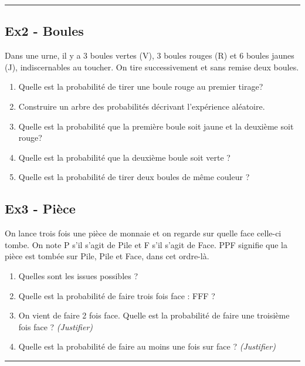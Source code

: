 \documentclass[11pt]{article}
\newcommand{\horrule}[1]{\rule{\linewidth}{#1}} %
\begin{document}
\horrule{1px}

\begin{multicols}{2}
  \subsection*{Ex2 - Boules}
  Dans une urne, il y a 3 boules vertes (V), 3 boules rouges (R) et 6 boules jaunes (J), indiscernables au toucher. On tire successivement et sans remise
  deux boules.
  \begin{enumerate}
  \item Quelle est la probabilité de tirer une boule rouge au premier tirage?
  \item Construire un arbre des probabilités décrivant l'expérience aléatoire.
  \item Quelle est la probabilité que la première boule soit jaune et la deuxième soit rouge?
  \item Quelle est la probabilité que la deuxième boule soit verte ?
  \item Quelle est la probabilité de tirer deux boules de même couleur ?
  \end{enumerate}

  \subsection*{Ex3 - Pièce}

  On lance trois fois une pièce de monnaie et on regarde sur quelle face celle-ci tombe. On note P s’il s’agit de Pile et F s’il s’agit de Face. 
  PPF signifie que la pièce est tombée sur Pile, Pile et Face, dans cet ordre-là.

  \begin{enumerate}
  \item Quelles sont les issues possibles ?
  \item Quelle est la probabilité de faire trois fois face : FFF ?  
  \item On vient de faire 2 fois face. Quelle est la probabilité de faire une troisième fois face ? \textit{(Justifier)}
  \item Quelle est la probabilité de faire au moins une fois sur face ? \textit{(Justifier)}
  \end{enumerate}
\end{multicols}

\vspace{-0.4cm}
\horrule{1px}
\vspace{-0.8cm}
\end{document}

